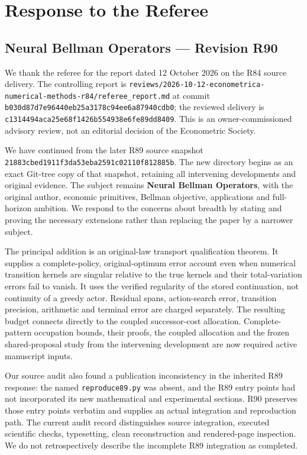 \hypertarget{response-to-the-referee}{%
\section{Response to the Referee}\label{response-to-the-referee}}

\hypertarget{neural-bellman-operators-revision-r90}{%
\subsection{Neural Bellman Operators --- Revision
R90}\label{neural-bellman-operators-revision-r90}}

We thank the referee for the report dated 12 October 2026 on the R84
source delivery. The controlling report is
\texttt{reviews/2026-10-12-econometrica-numerical-methods-r84/referee\_report.md}
at commit \texttt{b030d87d7e96440eb25a3178c94ee6a87940cdb0}; the
reviewed delivery is \texttt{c1314494aca25e68f1426b554938e6fe89dd8409}.
This is an owner-commissioned advisory review, not an editorial decision
of the Econometric Society.

We have continued from the later R89 source snapshot
\texttt{21883cbed1911f3da53eba2591c02110f812885b}. The new directory
begins as an exact Git-tree copy of that snapshot, retaining all
intervening developments and original evidence. The subject remains
\textbf{Neural Bellman Operators}, with the original author, economic
primitives, Bellman objective, applications and full-horizon ambition.
We respond to the concerns about breadth by stating and proving the
necessary extensions rather than replacing the paper by a narrower
subject.

The principal addition is an original-law transport qualification
theorem. It supplies a complete-policy, original-optimum error account
even when numerical transition kernels are singular relative to the true
kernels and their total-variation errors fail to vanish. It uses the
verified regularity of the stored continuation, not continuity of a
greedy actor. Residual spans, action-search error, transition precision,
arithmetic and terminal error are charged separately. The resulting
budget connects directly to the coupled successor-cost allocation.
Complete-pattern occupation bounds, their proofs, the coupled allocation
and the frozen shared-proposal study from the intervening development
are now required active manuscript inputs.

Our source audit also found a publication inconsistency in the inherited
R89 response: the named \texttt{reproduce89.py} was absent, and the R89
entry points had not incorporated its new mathematical and experimental
sections. R90 preserves those entry points verbatim and supplies an
actual integration and reproduction path. The current audit record
distinguishes source integration, executed scientific checks,
typesetting, clean reconstruction and rendered-page inspection. We do
not retrospectively describe the incomplete R89 integration as
completed.

